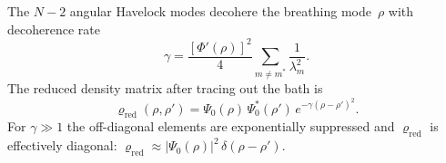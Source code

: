 \begin{proposition}
\label{prop:decoherence}
The $N{-}2$ angular Havelock modes decohere the
breathing mode~$\rho$ with decoherence rate
\begin{equation}\label{eq:decoherence-rate}
  \gamma = \frac{[\Phi'(\rho)]^2}{4}
  \sum_{m \ne m^*} \frac{1}{\lambda_m^2}.
\end{equation}
The reduced density matrix after tracing out the bath is
\[
  \varrho_{\mathrm{red}}(\rho, \rho')
  = \Psi_0(\rho)\,\Psi_0^*(\rho')\,e^{-\gamma(\rho-\rho')^2}.
\]
For $\gamma \gg 1$ the off-diagonal elements are
exponentially suppressed and $\varrho_{\mathrm{red}}$
is effectively diagonal:
$\varrho_{\mathrm{red}} \approx |\Psi_0(\rho)|^2\,
\delta(\rho - \rho')$.
\end{proposition}

